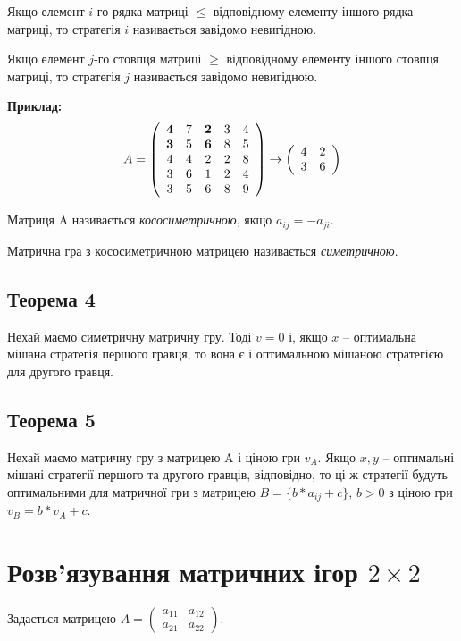 \documentclass[12pt,a4paper]{book}
\begin{document}
Якщо елемент $i$-го рядка матриці $\le$ відповідному елементу іншого рядка матриці, то стратегія $i$ називається завідомо невигідною.

Якщо елемент $j$-го стовпця матриці $\ge$ відповідному елементу іншого стовпця матриці, то стратегія $j$ називається завідомо невигідною.

{\bf Приклад:}
\[ A = \left ( \begin{array}{ccccc}
{\bf 4} & 7 & {\bf 2} & 3 & 4 \\
{\bf 3} & 5 & {\bf 6} & 8 & 5 \\
4 & 4 &  2 & 2 & 8 \\
3 & 6 & 1 & 2 & 4 \\
3 & 5 & 6 & 8 & 9
\end{array} \right ) \to \left (  \begin{array}{cc}
4 & 2 \\
3 & 6
\end{array} \right ) \]

Матриця A називається \emph{кососиметричною}, якщо $a_{ij} = -a_{ji}$.

Матрична гра з кососиметричною матрицею називається \emph{симетричною}.

\subsection{Теорема 4}

Нехай маємо симетричну матричну гру. Тоді $v=0$ і, якщо $x$ -- оптимальна мішана стратегія першого гравця, то вона є і оптимальною мішаною стратегією для другого гравця.

\subsection{Теорема 5}

Нехай маємо матричну гру з матрицею A і ціною гри $v_A$. Якщо $x,y$ -- оптимальні мішані стратегії першого та другого гравців, відповідно, то ці ж стратегії будуть оптимальними для матричної гри з матрицею $B = \{b*a_{ij}+c\}, \, b > 0$ з ціною гри $v_B = b*v_A+c$.

\section{Розв’язування матричних ігор $2 \times 2$}

Задається матрицею $A=\left ( \begin{array}{cc}a_{11}&a_{12}\\a_{21}&a_{22}\end{array}\right)$.
\end{document}
